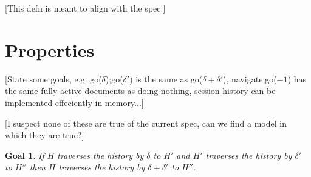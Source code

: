 \documentclass{article}
\newtheorem{goal}{Goal}
\begin{document}
[This defn is meant to align with the spec.]

\section{Properties}


[State some goals, e.g. go($\delta$);go($\delta'$) is the same as go($\delta+\delta'$),
  navigate;go($-1$) has the same fully active documents as doing nothing,
  session history can be implemented effeciently in memory...]

[I suspect none of these are true of the current spec, can we find a model in which
  they are true?]

\begin{goal}
\label{goal:homomorphism}
  If $H$ traverses the history by $\delta$ to $H'$
  and $H'$ traverses the history by $\delta'$ to $H''$
  then $H$ traverses the history by $\delta+\delta'$ to $H''$.
\end{goal}
\end{document}
